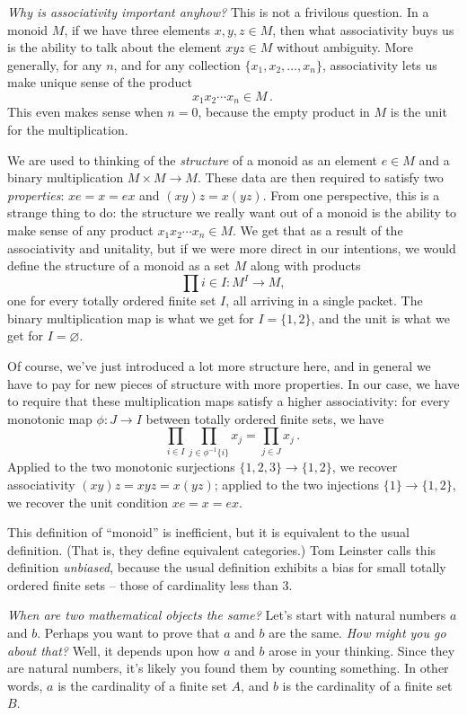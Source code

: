\emph{Why is associativity important anyhow?}
This is not a frivilous question.
In a monoid $M$, if we have three elements $x,y,z \in M$, then what associativity buys us is the ability to talk about the element $xyz \in M$ without ambiguity.
More generally, for any $n$, and for any collection $\{x_1,x_2,\dots,x_n\}$, associativity lets us make unique sense of the product
\[
  x_1 x_2 \cdots x_n \in M \period
\]
This even makes sense when $n = 0$, because the empty product in $M$ is the unit for the multiplication.

We are used to thinking of the \emph{structure} of a monoid as an element $e \in M$ and a binary multiplication $M \times M \to M$.
These data are then required to satisfy two \emph{properties}: $xe=x=ex$ and $(xy)z=x(yz)$.
From one perspective, this is a strange thing to do:
the structure we really want out of a monoid is the ability to make sense of any product $x_1 x_2 \cdots x_n \in M$.
We get that as a result of the associativity and unitality, but
if we were more direct in our intentions, we would define the structure of a monoid as a set $M$ along with products
\[
  \prod{i \in I} \colon M^I \to M \comma
\]
one for every totally ordered finite set $I$, all arriving in a single packet.
The binary multiplication map is what we get for $I = \{1,2\}$, and the unit is what we get for $I = \varnothing$.

Of course, we've just introduced a lot more structure here, and
in general we have to pay for new pieces of structure with more properties.
In our case, we have to require that these multiplication maps satisfy a higher associativity:
for every monotonic map $\phi \colon J \to I$ between totally ordered finite sets, we have
\[
  \prod_{i \in I} \prod_{j \in \phi^{-1}\{i\}} x_j = \prod_{j \in J} x_j \period
\]
Applied to the two monotonic surjections $\{1,2,3\} \to \{1,2\}$, we recover associativity $(xy)z = xyz = x(yz)$;
applied to the two injections $\{1\} \to \{1,2\}$, we recover the unit condition $xe=x=ex$.

This definition of \enquote{monoid} is inefficient, but
it is equivalent to the usual definition.
(That is, they define equivalent categories.)
Tom Leinster calls this definition \emph{unbiased}, because
the usual definition exhibits a bias for small totally ordered finite sets -- those of cardinality less than $3$.


\emph{When are two mathematical objects the same?}
Let's start with natural numbers $a$ and $b$.
Perhaps you want to prove that $a$ and $b$ are the same.
\emph{How might you go about that?}
Well, it depends upon how $a$ and $b$ arose in your thinking.
Since they are natural numbers, it's likely you found them by counting something.
In other words, $a$ is the cardinality of a finite set $A$, and
$b$ is the cardinality of a finite set $B$.

